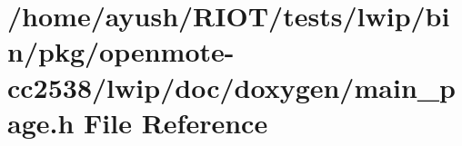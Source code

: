 \hypertarget{openmote-cc2538_2lwip_2doc_2doxygen_2main__page_8h}{}\section{/home/ayush/\+R\+I\+O\+T/tests/lwip/bin/pkg/openmote-\/cc2538/lwip/doc/doxygen/main\+\_\+page.h File Reference}
\label{openmote-cc2538_2lwip_2doc_2doxygen_2main__page_8h}

